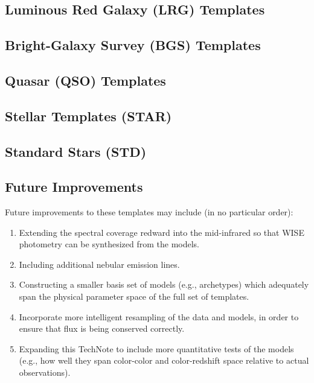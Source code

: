 \documentclass[11pt]{article}
\begin{document}
\subsection{Luminous Red Galaxy (LRG) Templates} 


\subsection{Bright-Galaxy Survey (BGS) Templates} 

\subsection{Quasar (QSO) Templates }


\subsection{Stellar Templates (STAR)}


\subsection{Standard Stars (STD)}

\subsection{Future Improvements}

Future improvements to these templates may include (in no particular
order): 

\begin{enumerate}
\item{Extending the spectral coverage redward into the mid-infrared so
  that WISE photometry can be synthesized from the models.}
\item{Including additional nebular emission lines.}
\item{Constructing a smaller basis set of models (e.g., archetypes)
  which adequately span the physical parameter space of the full set
  of templates.}
\item{Incorporate more intelligent resampling of the data and models,
  in order to ensure that flux is being conserved correctly.}
\item{Expanding this TechNote to include more quantitative tests of
  the models (e.g., how well they span color-color and color-redshift
  space relative to actual observations).}
\end{enumerate}




%
\end{document}

